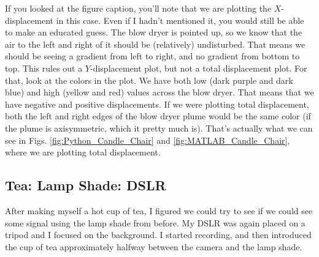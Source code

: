 \documentclass[letterpaper,12pt]{article}
\begin{document}
If you looked at the figure caption, you'll note that we are plotting the $X$-displacement in this case.  Even if I hadn't mentioned it, you would still be able to make an educated guess.  The blow dryer is pointed up, so we know that the air to the left and right of it should be (relatively) undisturbed.  That means we should be seeing a gradient from left to right, and no gradient from bottom to top.  This rules out a $Y$-displacement plot, but not a total displacement plot.  For that, look at the colors in the plot.  We have both low (dark purple and dark blue) and high (yellow and red) values across the blow dryer.  That means that we have negative and positive displacements.  If we were plotting total displacement, both the left and right edges of the blow dryer plume would be the same color (if the plume is axisymmetric, which it pretty much is).  That's actually what we can see in Figs. \ref{fig:Python_Candle_Chair} and \ref{fig:MATLAB_Candle_Chair}, where we are plotting total displacement.

\subsection{Tea: Lamp Shade: DSLR}
\label{subsec:Tea_Lamp_Shade_DSLR}

After making myself a hot cup of tea, I figured we could try to see if we could see some signal using the lamp shade from before.  My DSLR was again placed on a tripod and I focused on the background.  I started recording, and then introduced the cup of tea approximately halfway between the camera and the lamp shade.
\end{document}
